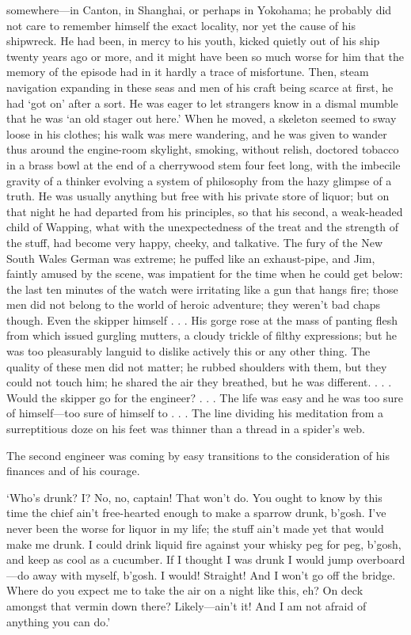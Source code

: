 somewhere—in Canton, in Shanghai, or perhaps in Yokohama; he probably did not care to remember himself the exact locality, nor yet the cause of his shipwreck. He had been, in mercy to his youth, kicked quietly out of his ship twenty years ago or more, and it might have been so much worse for him that the memory of the episode had in it hardly a trace of misfortune. Then, steam navigation expanding in these seas and men of his craft being scarce at first, he had ‘got on’ after a sort. He was eager to let strangers know in a dismal mumble that he was ‘an old stager out here.’ When he moved, a skeleton seemed to sway loose in his clothes; his walk was mere wandering, and he was given to wander thus around the engine-room skylight, smoking, without relish, doctored tobacco in a brass bowl at the end of a cherrywood stem four feet long, with the imbecile gravity of a thinker evolving a system of philosophy from the hazy glimpse of a truth. He was usually anything but free with his private store of liquor; but on that night he had departed from his principles, so that his second, a weak-headed child of Wapping, what with the unexpectedness of the treat and the strength of the stuff, had become very happy, cheeky, and talkative. The fury of the New South Wales German was extreme; he puffed like an exhaust-pipe, and Jim, faintly amused by the scene, was impatient for the time when he could get below: the last ten minutes of the watch were irritating like a gun that hangs fire; those men did not belong to the world of heroic adventure; they weren’t bad chaps though. Even the skipper himself . . . His gorge rose at the mass of panting flesh from which issued gurgling mutters, a cloudy trickle of filthy expressions; but he was too pleasurably languid to dislike actively this or any other thing. The quality of these men did not matter; he rubbed shoulders with them, but they could not touch him; he shared the air they breathed, but he was different. . . . Would the skipper go for the engineer? . . . The life was easy and he was too sure of himself—too sure of himself to . . . The line dividing his meditation from a surreptitious doze on his feet was thinner than a thread in a spider’s web.

The second engineer was coming by easy transitions to the consideration of his finances and of his courage.

‘Who’s drunk? I? No, no, captain! That won’t do. You ought to know by this time the chief ain’t free-hearted enough to make a sparrow drunk, b’gosh. I’ve never been the worse for liquor in my life; the stuff ain’t made yet that would make me drunk. I could drink liquid fire against your whisky peg for peg, b’gosh, and keep as cool as a cucumber. If I thought I was drunk I would jump overboard—do away with myself, b’gosh. I would! Straight! And I won’t go off the bridge. Where do you expect me to take the air on a night like this, eh? On deck amongst that vermin down there? Likely—ain’t it! And I am not afraid of anything you can do.’

